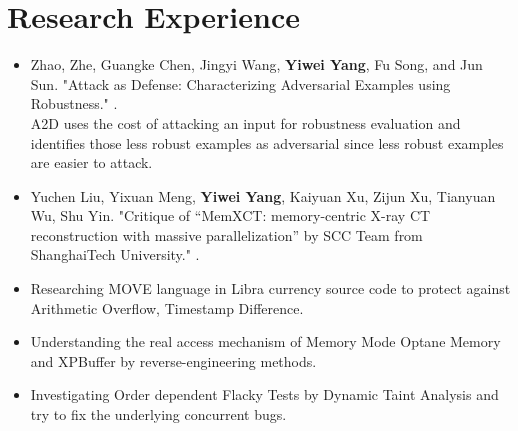 \documentclass{resume}
\newcommand{\en}[1]{#1}
\newcommand{\zh}[1]{}
\begin{document}
\section{\en{Research Experience}\zh{研究经历}}
\en{}
\zh{\datedsubsection{\textbf{\href{http://s3l.shanghaitech.edu.cn/}{上海科技大学系统}\href{https://toast-lab.gitee.io/}{实验室}}}{2019/07 -- 2021/06}}
\en{}
\zh{\role{本科生科研}{实习}}
\begin{itemize}
      \item Zhao, Zhe, Guangke Chen, Jingyi Wang, \textbf{Yiwei Yang}, Fu Song, and Jun Sun. "Attack as Defense: Characterizing Adversarial Examples using Robustness."  .\\
            \small{ \en{A2D uses the cost of attacking an input for robustness evaluation and identifies those less robust examples as adversarial since less robust examples are easier to attack.}
            \zh{A2D使用攻击输入的成本来进行鲁棒性评估，并将那些鲁棒性较差的例子确定为对抗性，因为鲁棒性较差的例子更容易被攻击。}}
      \item Yuchen Liu, Yixuan Meng, \textbf{Yiwei Yang}, Kaiyuan Xu, Zijun Xu, Tianyuan Wu, Shu Yin. "Critique of “MemXCT: memory-centric X-ray CT reconstruction with massive parallelization” by SCC Team from ShanghaiTech University."  .
      \item \en{Researching MOVE language in Libra currency source code to protect against Arithmetic Overflow, Timestamp Difference.}
            \zh{研究libra源码中的MOVE prover，提高抵御时间戳攻击、整数溢出等的安全性。}
      \item \en{Understanding the real access mechanism of Memory Mode Optane Memory and XPBuffer by reverse-engineering methods.}
            \zh{通过逆向工程的相关手段去理解在memory mode 下傲腾内存以及XPBuffer的访存逻辑。}
\end{itemize}

\en{}
\zh{\datedsubsection{\textbf{\href{https://illinois.edu}{伊利诺伊大学厄巴纳-香槟分校}\href{http://mir.cs.illinois.edu/marinov/}{Darko Marinov组}}}{2021/07 -- 2021/10}}
\en{}
\zh{\role{本科生科研}{暑研项目}}
\begin{itemize}
      \item \en{Investigating Order dependent Flacky Tests by Dynamic Taint Analysis and try to fix the underlying concurrent bugs.}
            \zh{使用动态污点分析在Flacky数据集上进行数据竞争检查，并尝试修复并发bug。}
\end{itemize}
\end{document}
